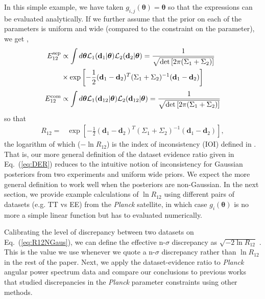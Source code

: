 \documentclass[amsmath, prl, reprint, aps]{revtex4-1}
\newcommand{\dv}{\textbf{d}}
\newcommand{\donev}{\textbf{d}_1}
\newcommand{\dtwov}{\textbf{d}_2}
\newcommand{\tv}{\bm{\theta}}
\newcommand{\saroj}[1]{\textcolor{blue}{(Saroj: #1)}}
\begin{document}
    In this simple example, we have taken $g_{i,j}(\tv) = \tv$ so that the expressions can be evaluated analytically. If we further assume that the prior on each of the parameters is uniform and wide (compared to the constraint on the parameter), we get \cite{IMM2012-03274},
    \begin{align}
        \nonumber
        E_{12}^{\rm sep} &\propto \int d\tv \mathcal{L}_1(\dv_1|\tv) \mathcal{L}_2(\dv_2|\tv) 
        = \frac{1}{\sqrt{\det\left[2\pi(\Sigma_1+\Sigma_2)\right]}} \\ & \times\exp \left[-\frac{1}{2}(\donev-\dtwov)^T(\Sigma_1+\Sigma_2)^{-1}(\donev-\dtwov)\right] 
        \\[0.1cm]
        E_{12}^{\rm com} &\propto \int d\tv \mathcal{L}_1(\dv_{12}|\tv) \mathcal{L}_2(\dv_{12}|\tv)  
        = \frac{1}{\sqrt{\det\left[2\pi(\Sigma_1 + \Sigma_2)\right]}}
        \nonumber
    \end{align}
    so that
    \begin{align}
        \!\!\!
        R_{12} =& \exp \left[-\frac{1}{2}(\donev-\dtwov)^T(\Sigma_1+\Sigma_2)^{-1}(\donev-\dtwov)\right], \label{eq:R12NGaus}
    \end{align}
    the logarithm of which ($-\ln R_{12}$) is the index of inconsistency (IOI) defined in \cite{Lin:2017ikq}. That is, our more general definition of the dataset evidence ratio given in Eq.~(\ref{eq:DER}) reduces to the intuitive notion of inconsistency for Gaussian posteriors from two experiments and uniform wide priors. We expect the more general definition to work well when the posteriors are non-Gaussian.
    In the next section, we provide example calculations of $\ln R_{12}$ using different pairs of datasets (e.g. TT vs EE) from the {\it Planck} satellite, in which case $g_i(\tv)$ is no more a simple linear function but has to evaluated numerically.
    
    Calibrating the level of discrepancy between two datasets on Eq.~(\ref{eq:R12NGaus}), we can define the effective n-$\sigma$ discrepancy as $\sqrt{-2 \ln R_{12}}$ \cite{Lin:2017bhs}. This is the value we use whenever we quote a n-$\sigma$ discrepancy rather than $\ln R_{12}$ in the rest of the paper. Next, we apply the dataset-evidence ratio to {\it Planck} angular power spectrum data and compare our conclusions to previous works that studied discrepancies in the {\it Planck} parameter constraints using other methods.
    
\end{document}
